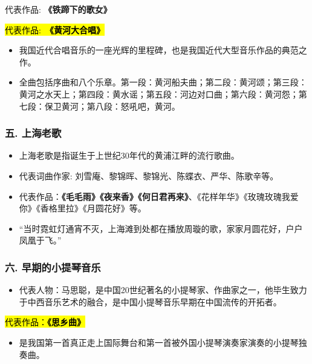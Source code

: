 \documentclass[
]{article}
\providecommand{\tightlist}{%
  \setlength{\itemsep}{0pt}\setlength{\parskip}{0pt}}
\begin{document}
代表作品: \textbf{《铁蹄下的歌女》}

\hl{\mbox{代表作品: \textbf{《黄河大合唱》}}}

\begin{itemize}
\tightlist
\item
  我国近代合唱音乐的一座光辉的里程碑，也是我国近代大型音乐作品的典范之作。
\item
  全曲包括序曲和八个乐章。第一段：黄河船夫曲；第二段：黄河颂；第三段：黄河之水天上；第四段：黄水谣；第五段：河边对口曲；第六段：黄河怨；第七段：保卫黄河；第八段：怒吼吧，黄河。
\end{itemize}

\subsubsection{五. 上海老歌}\label{ux4e94.-ux4e0aux6d77ux8001ux6b4c}

\begin{itemize}
\tightlist
\item
  上海老歌是指诞生于上世纪30年代的黄浦江畔的流行歌曲。
\item
  代表词曲作家: 刘雪庵、黎锦晖、黎锦光、陈蝶衣、严华、陈歌辛等。
\item
  代表作品：\textbf{《毛毛雨》《夜来香》《何日君再来》}、《花样年华》《玫瑰玫瑰我爱你》《香格里拉》《月圆花好》等。
\item
  ``当时霓虹灯通宵不灭，上海滩到处都在播放周璇的歌，家家月圆花好，户户凤凰于飞。''
\end{itemize}

\subsubsection{六.
早期的小提琴音乐}\label{ux516d.-ux65e9ux671fux7684ux5c0fux63d0ux7434ux97f3ux4e50}

\begin{itemize}
\tightlist
\item
  代表人物：马思聪，是中国20世纪著名的小提琴家、作曲家之一，他毕生致力于中西音乐艺术的融合，是中国小提琴音乐早期在中国流传的开拓者。
\end{itemize}

\hl{\mbox{代表作品：\textbf{《思乡曲》}}}

\begin{itemize}
\tightlist
\item
  是我国第一首真正走上国际舞台和第一首被外国小提琴演奏家演奏的小提琴独奏曲。
\end{itemize}
\end{document}

